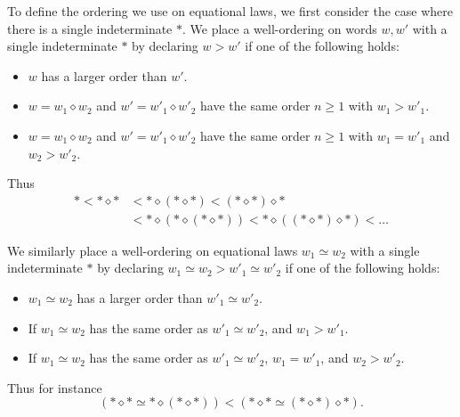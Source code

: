 \documentclass[12pt]{amsart}
\theoremstyle{definition}
\newcommand{\op}{\diamond}
\newcommand{\formaleq}{\simeq}
\begin{document}
To define the ordering we use on equational laws, we first consider the case where there is a single indeterminate $\ast$.
We place a well-ordering on words $w,w'$ with a single indeterminate $\ast$ by declaring $w > w'$ if one of the following holds:
\begin{itemize}
    \item $w$ has a larger order than $w'$.
    \item $w = w_1 \op w_2$ and $w' = w'_1 \op w'_2$ have the same order $n \geq 1$ with $w_1 > w'_1$.
    \item $w = w_1 \op w_2$ and $w' = w'_1 \op w'_2$ have the same order $n \geq 1$ with $w_1 = w'_1$ and $w_2 > w'_2$.
\end{itemize}
Thus
\begin{align*}
  \ast < \ast \op \ast &< \ast \op (\ast \op \ast) < (\ast \op \ast) \op \ast \\
  & < \ast \op (\ast \op (\ast \op \ast)) < \ast \op ((\ast \op \ast) \op \ast) < \dots
\end{align*}

We similarly place a well-ordering on equational laws $w_1 \formaleq w_2$ with a single indeterminate $\ast$ by declaring $w_1 \formaleq w_2 > w'_1 \formaleq w'_2$ if one of the following holds:
\begin{itemize}
\item  $w_1 \formaleq w_2$ has a larger order than $w'_1 \formaleq w'_2$.
\item If $w_1 \formaleq w_2$ has the same order as $w'_1 \formaleq w'_2$, and $w_1 > w'_1$.
\item If $w_1 \formaleq w_2$ has the same order as $w'_1 \formaleq w'_2$, $w_1 = w'_1$, and $w_2 > w'_2$.
\end{itemize}
Thus for instance
$$ (\ast \op \ast \formaleq \ast \op (\ast \op \ast)) < (\ast \op \ast \formaleq (\ast \op \ast) \op \ast).$$
\end{document}
